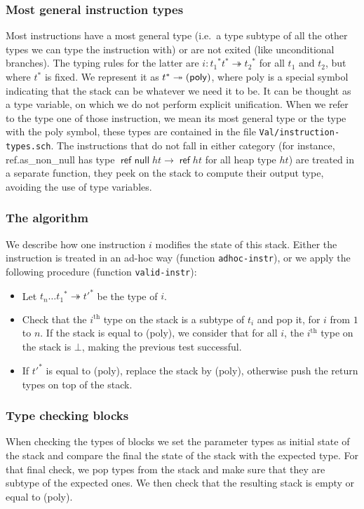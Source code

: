\documentclass[a4paper,11pt]{article}
\DeclareMathOperator{\reft}{\textsf{ref}}
\DeclareMathOperator{\refnullt}{\textsf{ref null}}
\begin{document}
\subsubsection{Most general instruction types}
Most instructions have a most general type (i.e.\ a type subtype of all the
other types we can type the instruction with) or are not exited (like
unconditional branches). The typing rules for the latter are
$i:{t_1}^*t^*\twoheadrightarrow {t_2}^*$ for all $t_1$ and $t_2$, but where
$t^*$ is fixed. We represent it as $t^*\twoheadrightarrow
(\text{\textsf{poly}})$, where \textsf{poly} is a special symbol indicating that
the stack can be whatever we need it to be. It can be thought as a type
variable, on which we do not perform explicit unification. When we refer to the
type one of those instruction, we mean its most general type or the type with
the \textsf{poly} symbol, these types are contained in the file
\texttt{Val/instruction-types.sch}. The instructions that do not fall in either
category (for instance, \textsf{ref.as\_non\_null} has type $\refnullt ht\to
\reft ht$ for all heap type $ht$) are treated in a separate function, they peek
on the stack to compute their output type, avoiding the use of type variables.

\subsubsection{The algorithm}
We describe how one instruction $i$ modifies the state of this stack. Either the
instruction is treated in an ad-hoc way (function \texttt{adhoc-instr}), or we
apply the following procedure (function \texttt{valid-instr}):

\begin{itemize}
\item Let ${t_n\ldots t_1}^*\twoheadrightarrow{t'}^*$ be the type of $i$.
\item Check that the $i^{\text{th}}$ type on the stack is a subtype of $t_i$ and
  pop it, for $i$ from $1$ to $n$. If the stack is equal to \textsf{(poly)}, we
  consider that for all $i$, the $i^{\text{th}}$ type on the stack is
  $\bot$, making the previous test successful.
\item If ${t'}^*$ is equal to \textsf{(poly)}, replace the stack by
  \textsf{(poly)}, otherwise push the return types on top of the stack.
\end{itemize}

\subsubsection{Type checking blocks}
When checking the types of blocks we set the parameter types as initial state of
the stack and compare the final the state of the stack with the expected type.
For that final check, we pop types from the stack and make sure that they are
subtype of the expected ones. We then check that the resulting stack is empty or
equal to \textsf{(poly)}.
\end{document}
